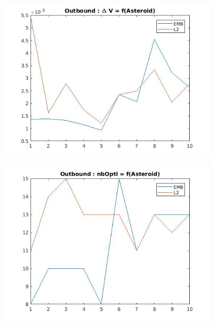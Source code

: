 \documentclass[fleqn,%
a4paper,11pt]{scrbook}
\begin{document}
\bigbreak
\begin{figure}
	\begin{minipage}[c]{.5\linewidth}
		\includegraphics[width=1\textwidth]{OutboundDeltaV10Ast.jpg} \\	
	\end{minipage}\hfill
	\begin{minipage}[c]{.5\linewidth}
		\includegraphics[width=1\textwidth]{OutboundnbOpti10Ast.jpg}	
	\end{minipage}
\end{figure}
\end{document}
